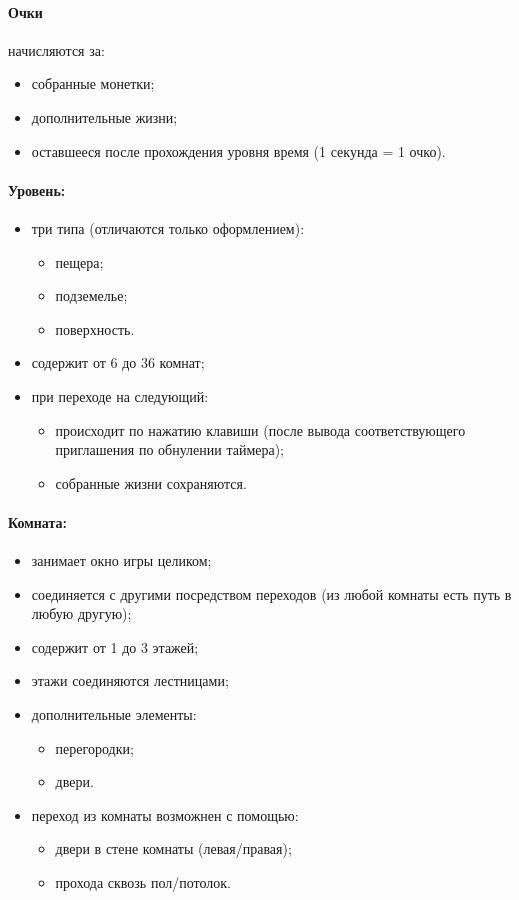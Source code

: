 \documentclass[12pt,a4paper,fullpage]{article}
\begin{document}
\paragraph{Очки} начисляются за:
\begin{itemize}
	\item собранные монетки;
	\item дополнительные жизни;
	\item оставшееся после прохождения уровня время (1 секунда = 1 очко).
\end{itemize}

\paragraph{Уровень:}
\begin{itemize}
	\item три типа (отличаются только оформлением):
	\begin{itemize}
		\item пещера;
		\item подземелье;
		\item поверхность.
	\end{itemize}
	\item содержит от 6 до 36 комнат;
	\item при переходе на следующий:
	\begin{itemize}
		\item происходит по нажатию клавиши (после вывода соответствующего приглашения по обнулении таймера);
		\item собранные жизни сохраняются.
	\end{itemize}
\end{itemize}

\paragraph{Комната:}
\begin{itemize}
	\item занимает окно игры целиком;
	\item соединяется с другими посредством переходов (из любой комнаты есть путь в любую другую);
	\item содержит от 1 до 3 этажей;
	\item этажи соединяются лестницами;
	\item дополнительные элементы:
	\begin{itemize}
		\item перегородки;
		\item двери.
	\end{itemize}
	\item переход из комнаты возможнен с помощью:
	\begin{itemize}
		\item двери в стене комнаты (левая/правая);
		\item прохода сквозь пол/потолок.
	\end{itemize}
\end{itemize}
\end{document}
